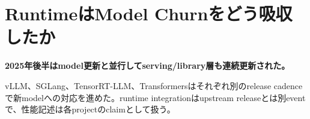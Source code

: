 \section{RuntimeはModel Churnをどう吸収したか}
\noindent\textbf{2025年後半はmodel更新と並行してserving/library層も連続更新された。}\autocite{src-43eaa2f12960,src-455a78bc36fa,src-58ef6e84aa65}

vLLM、SGLang、TensorRT-LLM、Transformersはそれぞれ別のrelease cadenceで新modelへの対応を進めた。runtime integrationはupstream releaseとは別eventで、性能記述は各projectのclaimとして扱う。\autocite{src-04b5c0f10b59,src-2595cdd4fabc,src-283a52c58291,src-4197b73cea93,src-43eaa2f12960,src-455a78bc36fa,src-58ef6e84aa65,src-a783d282600b,src-d4b1979540fd,src-ee0eb9562688}
